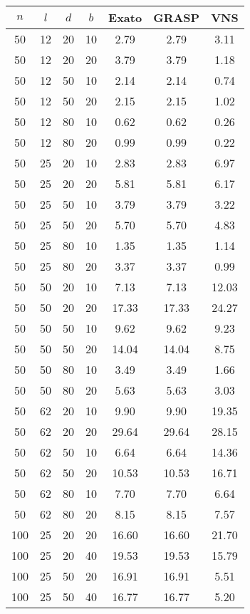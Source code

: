\begin{tabular}{ |c|c|c|c||c|c|c| }
\hline
$ n $ & $ l $ & $ d $ & $ b $ & Exato & GRASP & VNS \\
\hline
50 & 12 & 20 & 10 &   2.79 &   2.79 &   3.11 \\
50 & 12 & 20 & 20 &   3.79 &   3.79 &   1.18 \\
50 & 12 & 50 & 10 &   2.14 &   2.14 &   0.74 \\
50 & 12 & 50 & 20 &   2.15 &   2.15 &   1.02 \\
50 & 12 & 80 & 10 &   0.62 &   0.62 &   0.26 \\
50 & 12 & 80 & 20 &   0.99 &   0.99 &   0.22 \\
50 & 25 & 20 & 10 &   2.83 &   2.83 &   6.97 \\
50 & 25 & 20 & 20 &   5.81 &   5.81 &   6.17 \\
50 & 25 & 50 & 10 &   3.79 &   3.79 &   3.22 \\
50 & 25 & 50 & 20 &   5.70 &   5.70 &   4.83 \\
50 & 25 & 80 & 10 &   1.35 &   1.35 &   1.14 \\
50 & 25 & 80 & 20 &   3.37 &   3.37 &   0.99 \\
50 & 50 & 20 & 10 &   7.13 &   7.13 &  12.03 \\
50 & 50 & 20 & 20 &  17.33 &  17.33 &  24.27 \\
50 & 50 & 50 & 10 &   9.62 &   9.62 &   9.23 \\
50 & 50 & 50 & 20 &  14.04 &  14.04 &   8.75 \\
50 & 50 & 80 & 10 &   3.49 &   3.49 &   1.66 \\
50 & 50 & 80 & 20 &   5.63 &   5.63 &   3.03 \\
50 & 62 & 20 & 10 &   9.90 &   9.90 &  19.35 \\
50 & 62 & 20 & 20 &  29.64 &  29.64 &  28.15 \\
50 & 62 & 50 & 10 &   6.64 &   6.64 &  14.36 \\
50 & 62 & 50 & 20 &  10.53 &  10.53 &  16.71 \\
50 & 62 & 80 & 10 &   7.70 &   7.70 &   6.64 \\
50 & 62 & 80 & 20 &   8.15 &   8.15 &   7.57 \\
100 & 25 & 20 & 20 &  16.60 &  16.60 &  21.70 \\
100 & 25 & 20 & 40 &  19.53 &  19.53 &  15.79 \\
100 & 25 & 50 & 20 &  16.91 &  16.91 &   5.51 \\
100 & 25 & 50 & 40 &  16.77 &  16.77 &   5.20 \\

\end{tabular}
